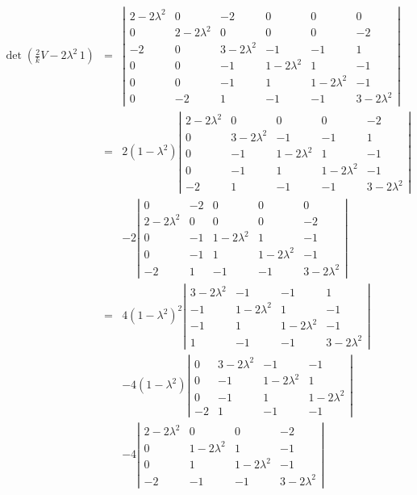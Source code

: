 \documentclass[letterpaper,11pt]{article}
\begin{document}
\begin{eqnarray*}
 \det(\frac{2}{k} V - 2 \lambda^2\,1) & = & \left| \begin{array}{cccccc}
 2 - 2 \lambda^2 & 0 & -2 & 0 & 0 & 0 \\
 0 & 2 - 2 \lambda^2 & 0 & 0 & 0 & -2 \\
 -2 & 0 & 3 - 2 \lambda^2 & -1 & -1 & 1 \\
 0 & 0 & -1 & 1 - 2 \lambda^2 & 1 & -1 \\
 0 & 0 & -1 & 1 & 1 - 2 \lambda^2 & -1 \\
 0 & -2 & 1 & -1 & -1 & 3 - 2 \lambda^2
 \end{array} \right| \\
 & = & 2 \left( 1 - \lambda^2 \right) \left| \begin{array}{ccccc}
 2 - 2 \lambda^2 & 0 & 0 & 0 & -2 \\
 0 & 3 - 2 \lambda^2 & -1 & -1 & 1 \\
 0 & -1 & 1 - 2 \lambda^2 & 1 & -1 \\
 0 & -1 & 1 & 1 - 2 \lambda^2 & -1 \\
 -2 & 1 & -1 & -1 & 3 - 2 \lambda^2
 \end{array} \right| \\
 & & - 2 \left| \begin{array}{ccccc}
 0 & -2 & 0 & 0 & 0 \\
 2 - 2 \lambda^2 & 0 & 0 & 0 & -2 \\
 0 & -1 & 1 - 2 \lambda^2 & 1 & -1 \\
 0 & -1 & 1 & 1 - 2 \lambda^2 & -1 \\
 -2 & 1 & -1 & -1 & 3 - 2 \lambda^2
 \end{array} \right| \\
 & = & 4 \left( 1 - \lambda^2 \right)^2 \left| \begin{array}{cccc}
 3 - 2 \lambda^2 & -1 & -1 & 1 \\
 -1 & 1 - 2 \lambda^2 & 1 & -1 \\
 -1 & 1 & 1 - 2 \lambda^2 & -1 \\
 1 & -1 & -1 & 3 - 2 \lambda^2
 \end{array} \right| \\
 & & - 4 \left( 1 - \lambda^2 \right) \left| \begin{array}{cccc}
 0 & 3 - 2 \lambda^2 & -1 & -1 \\
 0 & -1 & 1 - 2 \lambda^2 & 1 \\
 0 & -1 & 1 & 1 - 2 \lambda^2 \\
 -2 & 1 & -1 & -1
 \end{array} \right| \\
 & & - 4 \left| \begin{array}{cccc}
 2 - 2 \lambda^2 & 0 & 0 & -2 \\
 0 & 1 - 2 \lambda^2 & 1 & -1 \\
 0 & 1 & 1 - 2 \lambda^2 & -1 \\
 -2 & -1 & -1 & 3 - 2 \lambda^2
 \end{array} \right|
\end{eqnarray*}
\end{document}
